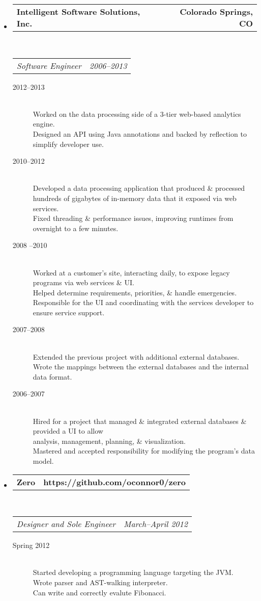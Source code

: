 \documentclass[10pt,letterpaper]{article}
\makeatletter
\newcommand{\headerrow}[2]
{\begin{tabular*}{\linewidth}{l@{\extracolsep{\fill}}r}
  #1 &
  #2 \\
\end{tabular*}}
\makeatother
\begin{document}
\begin{itemize}
  \item
  \headerrow
    {\textbf{Intelligent Software Solutions, Inc.}}
    {\textbf{Colorado Springs, CO}}
  \\
  \headerrow
    {\emph{Software Engineer}}
    {\emph{2006--2013}}
  \begin{description}
    \item[2012--2013] \hfill \\
        Worked on the data processing side of a 3-tier web-based analytics engine. \\
        Designed an API using Java annotations and backed by reflection to simplify developer use.
    \item[2010--2012] \hfill \\
        Developed a data processing application that produced \& processed hundreds of gigabytes of in-memory data that it exposed via web services. \\
        Fixed threading \& performance issues, improving runtimes from overnight to a few minutes.
    \item[2008 --2010] \hfill \\
        Worked at a customer’s site, interacting daily, to expose legacy programs via web services \& UI. \\
        Helped determine requirements, priorities, \& handle emergencies. \\
        Responsible for the UI and coordinating with the services developer to ensure service support.
    \item[2007--2008] \hfill \\
        Extended the previous project with additional external databases. \\
        Wrote the mappings between the external databases and the internal data format.
    \item[2006--2007] \hfill \\
        Hired for a project that managed \& integrated external databases \& provided a UI to allow \\ analysis, management, planning, \& visualization. \\
        Mastered and accepted responsibility for modifying the program’s data model.
  \end{description}

  \item
  \headerrow
    {\textbf{Zero}}
    {\textbf{https://github.com/oconnor0/zero}}
  \\
  \headerrow
    {\emph{Designer and Sole Engineer}}
    {\emph{March--April 2012}}
  \begin{description}
    \item[Spring 2012] \hfill \\
      Started developing a programming language targeting the JVM. \\
      Wrote parser and AST-walking interpreter. \\
      Can write and correctly evalute Fibonacci.
   \end{description}


\end{itemize}
\end{document}

